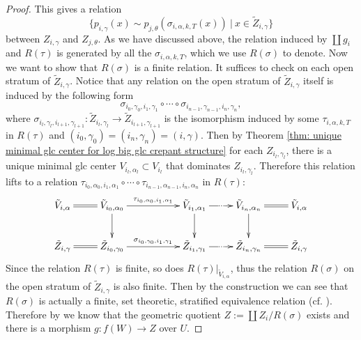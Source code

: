 \documentclass[11pt]{amsart}
\numberwithin{equation}{section}
\theoremstyle{definition}
\theoremstyle{definition}
\theoremstyle{definition}
\begin{document}
\begin{proof}
This gives a relation 
$$
\{p_{i,\gamma}(x)\sim p_{j,\theta}(\sigma_{i,\alpha,k,T}(x))~|~x\in\tilde{Z}_{i,\gamma}\}
$$
between $Z_{i,\gamma}$ and $Z_{j,\theta}$. As we have discussed above, the relation induced by $\coprod g_i$ and $R(\tau)$ is generated by all the $\sigma_{i,\alpha,k,T}$, which we use $R(\sigma)$ to denote. Now we want to show that $R(\sigma)$ is a finite relation. It suffices to check on each open stratum of $\tilde{Z}_{i,\gamma}$. Notice that any relation on the open stratum of $\tilde{Z}_{i,\gamma}$ itself is induced by the following form
$$
\sigma_{i_0,\gamma_0,i_1,\gamma_1}\circ\cdots\circ\sigma_{i_{n-1},\gamma_{n-1},i_n,\gamma_n},
$$
where 
$\sigma_{i_l,\gamma_{l},i_{l+1},\gamma_{l+1}}:\tilde{Z}_{i_l,\gamma_l}\to\tilde{Z}_{i_{l+1},\gamma_{l+1}}$ is the isomorphism induced by some $\tau_{i,\alpha,k,T}$ in $R(\tau)$ and $(i_0,\gamma_0)=(i_n,\gamma_n)=(i,\gamma)$. Then by Theorem \ref{thm: unique minimal glc center for log big glc crepant structure} for each $Z_{i_l,\gamma_l}$, there is a unique minimal glc center $V_{i_l,\alpha_l}\subset V_{i_l}$ that dominates $Z_{i_l,\gamma_l}$. Therefore this relation lifts to a relation $\tau_{i_0,\alpha_0,i_1,\alpha_1}\circ\cdots\circ\tau_{i_{n-1},\alpha_{n-1},i_n,\alpha_n}$ in $R(\tau)$:
\begin{displaymath}
    \xymatrix{
        \tilde{V}_{i,\alpha}\ar@{=}[r]&\tilde{V}_{i_0,\alpha_0} \ar[rr]^{\tau_{i_0,\alpha_0,i_1,\alpha_1}}\ar[d]& & \tilde{V}_{i_1,\alpha_1}\ar[r]|\cdots\ar[d] & \tilde{V}_{i_n,\alpha_n}\ar[d]\ar@{=}[r]&\tilde{V}_{i,\alpha} \\
        \tilde{Z}_{i,\gamma}\ar@{=}[r]&\tilde{Z}_{i_0,\gamma_0} \ar[rr]^{\sigma_{i_0,\gamma_0,i_1,\gamma_1}}& & \tilde{Z}_{i_1,\gamma_1}\ar[r]|\cdots & \tilde{Z}_{i_n,\gamma_n}\ar@{=}[r]&\tilde{Z}_{i,\gamma} 
    }
\end{displaymath}
Since the relation $R(\tau)$ is finite, so does $R(\tau)|_{\tilde{V}_{i,\alpha}}$, thus the relation $R(\sigma)$ on the open stratum of $\tilde{Z}_{i,\gamma}$ is also finite. Then by the construction we can see that $R(\sigma)$ is actually a finite, set theoretic, stratified equivalence relation (cf. \cite[Lemma 4.14]{LX22b}). Therefore by \cite[Theorem 9.21]{Kol13} we know that the geometric quotient $Z:=\coprod Z_i/R(\sigma)$ exists and there is a morphism $g:f(W)\to Z$ over $U$. 


\end{proof}
\end{document}
